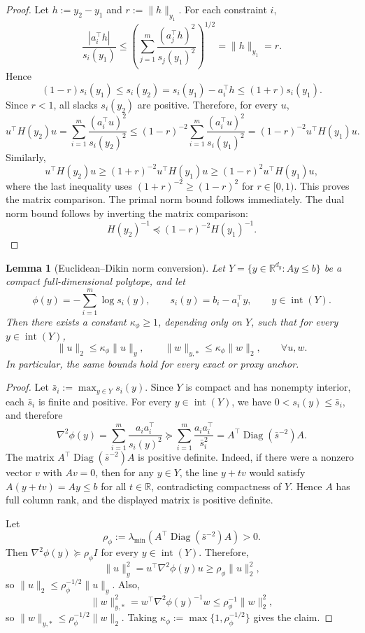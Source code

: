\documentclass{article}
\newtheorem{lemma}{Lemma}
\begin{document}
\begin{proof}
Let \(h:=y_2-y_1\) and \(r:=\|h\|_{y_1}\). For each constraint \(i\),
\[
\frac{|a_i^\top h|}{s_i(y_1)}
\le
\left(\sum_{j=1}^m\frac{(a_j^\top h)^2}{s_j(y_1)^2}\right)^{1/2}
=
\|h\|_{y_1}
=
r.
\]
Hence
\[
(1-r)s_i(y_1)
\le
s_i(y_2)
=
s_i(y_1)-a_i^\top h
\le
(1+r)s_i(y_1).
\]
Since \(r<1\), all slacks \(s_i(y_2)\) are positive. Therefore, for every \(u\),
\[
u^\top H(y_2)u
=
\sum_{i=1}^m\frac{(a_i^\top u)^2}{s_i(y_2)^2}
\le
(1-r)^{-2}
\sum_{i=1}^m\frac{(a_i^\top u)^2}{s_i(y_1)^2}
=
(1-r)^{-2}u^\top H(y_1)u.
\]
Similarly,
\[
u^\top H(y_2)u
\ge
(1+r)^{-2}u^\top H(y_1)u
\ge
(1-r)^2u^\top H(y_1)u,
\]
where the last inequality uses \((1+r)^{-2}\ge (1-r)^2\) for \(r\in[0,1)\). This proves the matrix
comparison. The primal norm bound follows immediately. The dual norm bound follows by inverting
the matrix comparison:
\[
H(y_2)^{-1}\preceq (1-r)^{-2}H(y_1)^{-1}.
\]
\end{proof}

\begin{lemma}[Euclidean--Dikin norm conversion]
\label{lem:euc_dikin}
Let \(Y=\{y\in\mathbb R^{d_y}:Ay\le b\}\) be a compact full-dimensional polytope, and let
\[
\phi(y)=-\sum_{i=1}^m\log s_i(y),
\qquad
s_i(y)=b_i-a_i^\top y,
\qquad
y\in\operatorname{int}(Y).
\]
Then there exists a constant \(\kappa_\phi\ge 1\), depending only on \(Y\), such that for every
\(y\in\operatorname{int}(Y)\),
\[
\|u\|_2\le \kappa_\phi\|u\|_y,
\qquad
\|w\|_{y,*}\le \kappa_\phi\|w\|_2,
\qquad
\forall u,w.
\]
In particular, the same bounds hold for every exact or proxy anchor.
\end{lemma}

\begin{proof}
Let \(\bar s_i:=\max_{y\in Y}s_i(y)\). Since \(Y\) is compact and has nonempty interior, each
\(\bar s_i\) is finite and positive. For every \(y\in\operatorname{int}(Y)\), we have
\(0<s_i(y)\le \bar s_i\), and therefore
\[
\nabla^2\phi(y)
=
\sum_{i=1}^m\frac{a_i a_i^\top}{s_i(y)^2}
\succcurlyeq
\sum_{i=1}^m\frac{a_i a_i^\top}{\bar s_i^2}
=
A^\top\operatorname{Diag}(\bar s^{-2})A.
\]
The matrix \(A^\top\operatorname{Diag}(\bar s^{-2})A\) is positive definite. Indeed, if there were a
nonzero vector \(v\) with \(Av=0\), then for any \(y\in Y\), the line \(y+tv\) would satisfy
\(A(y+tv)=Ay\le b\) for all \(t\in\mathbb R\), contradicting compactness of \(Y\). Hence
\(A\) has full column rank, and the displayed matrix is positive definite.

Let
\[
\rho_\phi
:=
\lambda_{\min}\!\left(A^\top\operatorname{Diag}(\bar s^{-2})A\right)>0.
\]
Then \(\nabla^2\phi(y)\succeq \rho_\phi I\) for every \(y\in\operatorname{int}(Y)\). Therefore,
\[
\|u\|_y^2
=
u^\top\nabla^2\phi(y)u
\ge
\rho_\phi\|u\|_2^2,
\]
so \(\|u\|_2\le \rho_\phi^{-1/2}\|u\|_y\). Also,
\[
\|w\|_{y,*}^2
=
w^\top\nabla^2\phi(y)^{-1}w
\le
\rho_\phi^{-1}\|w\|_2^2,
\]
so \(\|w\|_{y,*}\le \rho_\phi^{-1/2}\|w\|_2\). Taking
\(\kappa_\phi:=\max\{1,\rho_\phi^{-1/2}\}\) gives the claim.
\end{proof}
\end{document}

